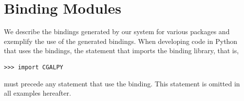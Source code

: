 \section{Binding Modules}
\label{sec:modules}
We describe the bindings generated by our system for various \cgal{}
packages and exemplify the use of the generated bindings.
%
When developing code in Python that uses the bindings, the statement
that imports the binding library, that is,
\begin{lstlisting}[style=pythonStyle]
>>> import CGALPY
\end{lstlisting}
must precede any statement that use the binding. This
statement is omitted in all examples hereafter.

